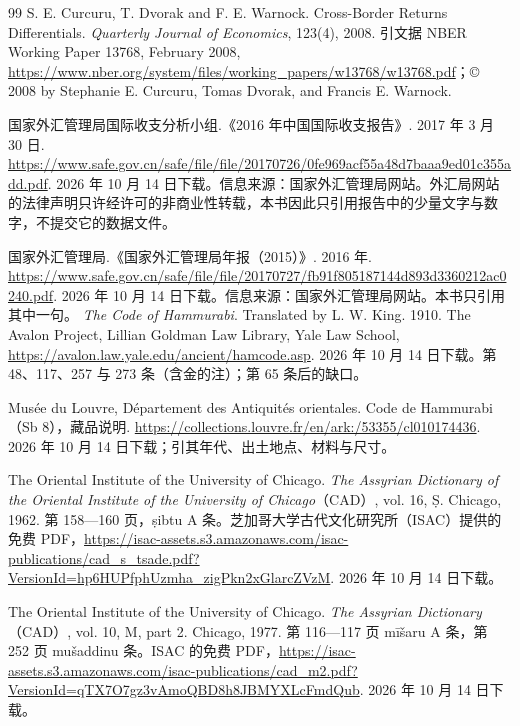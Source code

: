 \begin{thebibliography}{99}
 S. E. Curcuru, T. Dvorak and F. E. Warnock. Cross-Border Returns Differentials. \emph{Quarterly Journal of Economics}, 123(4), 2008. 引文据 NBER Working Paper 13768, February 2008, \url{https://www.nber.org/system/files/working_papers/w13768/w13768.pdf}；© 2008 by Stephanie E. Curcuru, Tomas Dvorak, and Francis E. Warnock.

 国家外汇管理局国际收支分析小组.《2016 年中国国际收支报告》. 2017 年 3 月 30 日. \url{https://www.safe.gov.cn/safe/file/file/20170726/0fe969acf55a48d7baaa9ed01c355add.pdf}. 2026 年 10 月 14 日下载。信息来源：国家外汇管理局网站。外汇局网站的法律声明只许经许可的非商业性转载，本书因此只引用报告中的少量文字与数字，不提交它的数据文件。

 国家外汇管理局.《国家外汇管理局年报（2015）》. 2016 年. \url{https://www.safe.gov.cn/safe/file/file/20170727/fb91f805187144d893d3360212ac0240.pdf}. 2026 年 10 月 14 日下载。信息来源：国家外汇管理局网站。本书只引用其中一句。
 \emph{The Code of Hammurabi}. Translated by L. W. King. 1910. The Avalon Project, Lillian Goldman Law Library, Yale Law School, \url{https://avalon.law.yale.edu/ancient/hamcode.asp}. 2026 年 10 月 14 日下载。第 48、117、257 与 273 条（含金的注）；第 65 条后的缺口。

 Musée du Louvre, Département des Antiquités orientales. Code de Hammurabi（Sb 8），藏品说明. \url{https://collections.louvre.fr/en/ark:/53355/cl010174436}. 2026 年 10 月 14 日下载；引其年代、出土地点、材料与尺寸。

 The Oriental Institute of the University of Chicago. \emph{The Assyrian Dictionary of the Oriental Institute of the University of Chicago}（CAD）, vol. 16, Ṣ. Chicago, 1962. 第 158—160 页，ṣibtu A 条。芝加哥大学古代文化研究所（ISAC）提供的免费 PDF，\url{https://isac-assets.s3.amazonaws.com/isac-publications/cad_s_tsade.pdf?VersionId=hp6HUPfphUzmha_zigPkn2xGlarcZVzM}. 2026 年 10 月 14 日下载。

 The Oriental Institute of the University of Chicago. \emph{The Assyrian Dictionary}（CAD）, vol. 10, M, part 2. Chicago, 1977. 第 116—117 页 mīšaru A 条，第 252 页 mušaddinu 条。ISAC 的免费 PDF，\url{https://isac-assets.s3.amazonaws.com/isac-publications/cad_m2.pdf?VersionId=qTX7O7gz3vAmoQBD8h8JBMYXLcFmdQub}. 2026 年 10 月 14 日下载。


\end{thebibliography}
